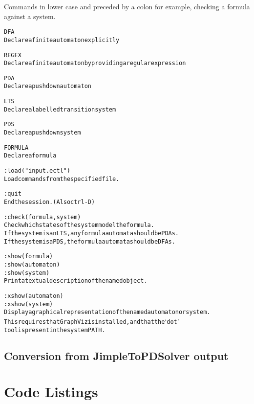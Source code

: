 \documentclass[11pt]{article}
\theoremstyle{definition}
\begin{document}
Commands in lower case and preceded by a colon 
for example, checking a formula against a system.

\begin{alltt}
DFA
Declare a finite automaton explicitly

REGEX
Declare a finite automaton by providing a regular expression

PDA
Declare a pushdown automaton

LTS
Declare a labelled transition system

PDS
Declare a pushdown system 

FORMULA
Declare a formula

:load("input.ectl")
Load commands from the specified file.

:quit
End the session. (Also ctrl-D)

:check(formula, system)
Check which states of the system model the formula.
If the system is an LTS, any formula automata should be PDAs.
If the system is a PDS, the formula automata should be DFAs.

:show(formula)
:show(automaton)
:show(system)
Print a textual description of the named object.

:xshow(automaton)
:xshow(system)
Display a graphical representation of the named automaton or system.
This requires that GraphViz is installed, and that the `dot'
tool is present in the system PATH.
\end{alltt}

\subsection{Conversion from JimpleToPDSolver output}





\section{Code Listings}

\end{document}
